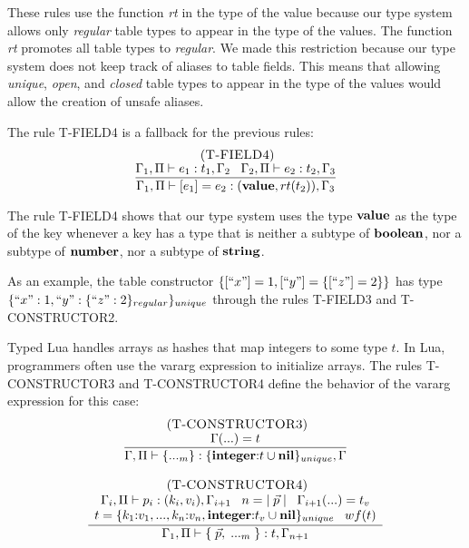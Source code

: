 These rules use the function \emph{rt} in the type of the value
because our type system allows only \emph{regular} table types to
appear in the type of the values.
The function \emph{rt} promotes all table types to \emph{regular}.
We made this restriction because our type system does not keep track
of aliases to table fields.
This means that allowing \emph{unique}, \emph{open}, and \emph{closed}
table types to appear in the type of the values would allow the creation
of unsafe aliases.

The rule \textsc{T-FIELD4} is a fallback for the previous rules:
\[
\begin{array}{c}
\; (\textsc{T-FIELD4})\\
\dfrac{\Gamma_{1}, \Pi \vdash e_{1}:t_{1}, \Gamma_{2} \;\;\;
       \Gamma_{2}, \Pi \vdash e_{2}:t_{2}, \Gamma_{3}}
      {\Gamma_{1}, \Pi \vdash [e_{1}] = e_{2}: (\mathbf{value},rt(t_{2})), \Gamma_{3}}
\end{array}
\]

The rule \textsc{T-FIELD4} shows that our type system uses the type $\mathbf{value}$
as the type of the key whenever a key has a type that is neither a
subtype of $\mathbf{boolean}$, nor a subtype of $\mathbf{number}$, nor a subtype of $\mathbf{string}$.

As an example, the table constructor $\{[``x"] = 1, [``y"] = \{[``z"] = 2\}\}$
has type $\{``x":1, ``y":\{``z":2\}_{regular}\}_{unique}$ through the rules
\textsc{T-FIELD3} and \textsc{T-CONSTRUCTOR2}.

Typed Lua handles arrays as hashes that map integers to some type $t$.
In Lua, programmers often use the vararg expression to initialize arrays.
The rules \textsc{T-CONSTRUCTOR3} and \textsc{T-CONSTRUCTOR4} define
the behavior of the vararg expression for this case:
\[
\begin{array}{c}
\begin{array}{c}
\; (\textsc{T-CONSTRUCTOR3})\\
\dfrac{\Gamma({...}) = t}
      {\Gamma, \Pi \vdash \{{...}_{m}\}:\{\mathbf{integer}{:}t \cup \mathbf{nil}\}_{unique}, \Gamma}
\end{array}
\\ \\
\begin{array}{c}
\; (\textsc{T-CONSTRUCTOR4})\\
\dfrac{\begin{array}{c}
       \Gamma_{i}, \Pi \vdash p_{i}:(k_{i},v_{i}), \Gamma_{i+1} \;\;\;
       n = |\;\vec{p}\;| \;\;\;
       \Gamma_{i+1}({...}) = t_{v}\\
       t = \{k_{1}{:}v_{1}, ..., k_{n}{:}v_{n}, \mathbf{integer}{:}t_{v} \cup \mathbf{nil}\}_{unique} \;\;\;
       wf(t)
       \end{array}}
      {\Gamma_{1}, \Pi \vdash \{\;\vec{p},\;{...}_{m}\;\}:t, \Gamma_{n+1}}
\end{array}
\end{array}
\]

